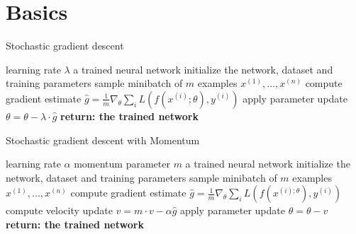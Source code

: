 \documentclass[
a4paper, 12pt, %
titlepage, 		 %
twoside,			 %
headsepline,	 %
BCOR5mm,			 %
idxtotoc, bibtotoc]{scrreprt}	%
\begin{document}
\section{Basics}
\begin{algorithm}\label{alg:SGD}
    \begin{algorithmic}[1]
        \caption{Stochastic gradient descent}
        \REQUIRE learning rate $\lambda$
        \ENSURE a trained neural network
        \STATE initialize the network, dataset and training parameters
            \STATE sample minibatch of $m$ examples ${x^{(1)}, ... ,x^{(n)}}$
            \STATE compute gradient estimate $\hat{g}=\frac{1}{m} \nabla_\theta \sum_i L(f(x^{(i)};\theta),y^{(i)})$
            \STATE apply parameter update $\theta=\theta-\lambda\cdot\hat{g}$
        \ENDWHILE
        \STATE \textbf{return: the trained network}
    \end{algorithmic}
\end{algorithm}

\begin{algorithm}
    \begin{algorithmic}[1]
        \caption{Stochastic gradient descent with Momentum}
        \REQUIRE learning rate $\alpha$
        \REQUIRE momentum parameter $m$
        \ENSURE a trained neural network
        \STATE initialize the network, dataset and training parameters
            \STATE sample minibatch of $m$ examples ${x^{(1)}, ... ,x^{(n)}}$
            \STATE compute gradient estimate $\hat{g}=\frac{1}{m} \nabla_\theta \sum_i L(f(x^{(i);\theta}),y^{(i)})$
            \STATE compute velocity update $v=m \cdot v - \alpha \hat{g}$
            \STATE apply parameter update $\theta=\theta-v$
        \ENDWHILE
        \STATE \textbf{return: the trained network}
    \end{algorithmic}
\end{algorithm}

\begin{figure}[h]\label{fig:Results_scheduler}
    \begin{center}
    \end{center}
\end{figure}
\end{document}
